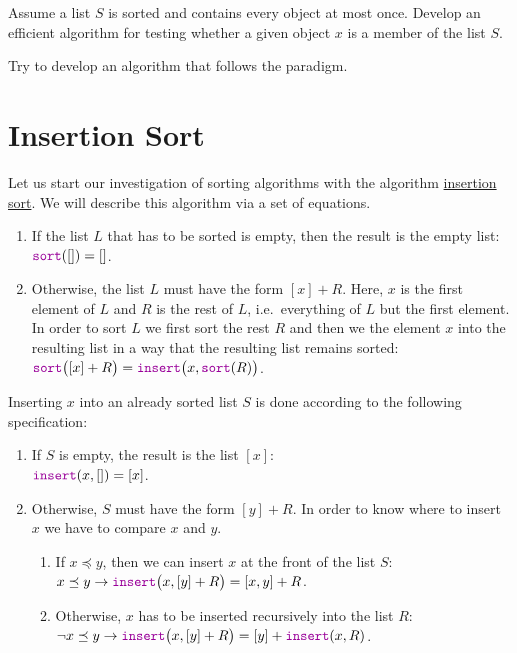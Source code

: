 \exercise
Assume a list $S$ is sorted and contains every object at most once.  Develop an efficient
algorithm for testing whether a given object $x$ is a member of the list $S$.

\hint Try to develop an algorithm that follows the 
paradigm. 
\eoxs

\section{Insertion Sort \label{sec:insertionSort}}
Let us start our investigation of sorting algorithms with the algorithm
\href{http://en.wikipedia.org/wiki/Insertion_sort}{insertion sort}.
We will describe this algorithm via a set of equations.
\begin{enumerate}
\item If the list $L$ that has to be sorted is empty, then the result is the empty list: 
      \\[0.2cm]
      \hspace*{1.3cm}
      $\mytt{sort}([]) = []$.
\item Otherwise, the list $L$ must have the form $[x] + R$. Here, $x$ is the first element of $L$
      and $R$ is the rest of $L$, i.e.~everything of $L$ but the first element.  In order to sort
      $L$ we first sort the rest $R$ and then we  the element $x$ into the resulting list in a
      way that the resulting list remains sorted:
      \\[0.2cm]
      \hspace*{1.3cm} $\mytt{sort}\bigl([x] + R\bigr) = \mytt{insert}\bigl(x, \mytt{sort}(R)\bigr)$.
\end{enumerate}
Inserting $x$ into an already sorted list $S$ is done according to the following specification:
\begin{enumerate}
\item If $S$ is empty, the result is the list $[x]$: \\[0.2cm]
      \hspace*{1.3cm}
      $\mytt{insert}(x,[]) = [x]$.
\item Otherwise, $S$ must have the form $[y] + R$.  In order to know where to insert $x$ we have to
      compare $x$ and $y$.
      \begin{enumerate}
      \item If $x \preceq y$, then we can insert $x$ at the front of the list $S$: \\[0.2cm]
            \hspace*{1.3cm}
            $x \preceq y \rightarrow \mytt{insert}\bigl(x, [y] + R\bigr) = [x,y] + R$. 
      \item Otherwise, $x$ has to be inserted recursively into the list $R$: \\[0.2cm]
            \hspace*{1.3cm}
            $\neg x \preceq y \rightarrow \mytt{insert}\bigl(x, [y] + R\bigr) = [y] + \mytt{insert}(x,R)$. 
      \end{enumerate}
\end{enumerate}

